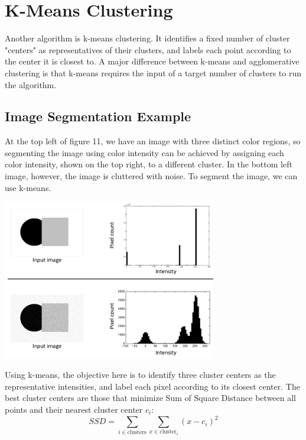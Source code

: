 \documentclass{article}
\begin{document}
\section{K-Means Clustering}
Another algorithm is k-means clustering. It identifies a fixed number of cluster "centers" as representatives of their clusters, and labels each point according to the center it is closest to. A major difference between k-means and agglomerative clustering is that k-means requires the input of a target number of clusters to run the algorithm.
\subsection{Image Segmentation Example}
At the top left of figure 11, we have an image with three distinct color regions, so segmenting the image using color intensity can be achieved by assigning each color intensity, shown on the top right, to a different cluster. In the bottom left image, however, the image is cluttered with noise. To segment the image, we can use k-means.

\begin{minipage}{\linewidth}
\begin{center}
\includegraphics[width=0.70\textwidth]{k-means-example.png}
\end{center}
\end{minipage}

Using k-means, the objective here is to identify three cluster centers as the representative intensities, and label each pixel according to its closest center. The best cluster centers are those that minimize Sum of Square Distance between all points and their nearest cluster center $c_i$:
\begin{equation}
SSD = \sum_{i \in \textrm{clusters}}\sum_{x \in \textrm{cluster}_i}(x-c_i)^2
\end{equation}
\end{document}
